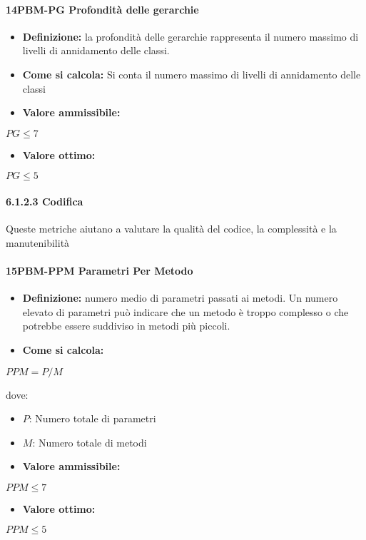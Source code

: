 \paragraph*{14PBM-PG Profondità delle gerarchie}
\begin{itemize}
    \item \textbf{Definizione:} la profondità delle gerarchie rappresenta il numero massimo di livelli di annidamento delle classi.
    \item \textbf{Come si calcola:} Si conta il numero massimo di livelli di annidamento delle classi
\end{itemize}
\begin{itemize}
    \item \textbf{Valore ammissibile:}
\end{itemize}
\begin{center}
    $PG \leq 7$
\end{center}
\begin{itemize}
    \item \textbf{Valore ottimo:}
\end{itemize}
\begin{center}
    $PG \leq 5$
\end{center}

\paragraph*{6.1.2.3 Codifica}
Queste metriche aiutano a valutare la qualità del codice, la complessità e la manutenibilità

\paragraph*{15PBM-PPM Parametri Per Metodo}
\begin{itemize}
    \item \textbf{Definizione:} numero medio di parametri passati ai metodi. Un numero elevato di parametri può indicare che un metodo è troppo complesso o che potrebbe essere suddiviso in metodi più piccoli.
    \item \textbf{Come si calcola:}
\end{itemize}
\begin{center}
   $PPM = P/M$ 
\end{center}
dove:
\begin{itemize}[label=$\rightarrow$]
    \item $P$: Numero totale di parametri
    \item $M$: Numero totale di metodi
\end{itemize}
\begin{itemize}
    \item \textbf{Valore ammissibile:}
\end{itemize}
\begin{center}
    $PPM \leq 7$
\end{center}
\begin{itemize}
    \item \textbf{Valore ottimo:}
\end{itemize}
\begin{center}
    $PPM \leq 5$
\end{center}

